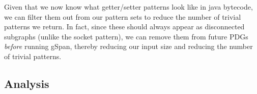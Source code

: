 \documentclass[12pt]{article}
\begin{document}
Given that we now know what getter/setter patterns look like in java bytecode, we can filter them out from our pattern sets to reduce the number of trivial patterns we return. In fact, since these should always appear as disconnected subgraphs (unlike the socket pattern), we can remove them from future PDGs {\em before} running gSpan, thereby reducing our input size and reducing the number of trivial patterns.

\subsection{Analysis}
\begin{table}[ht]
\end{table}
\end{document}
